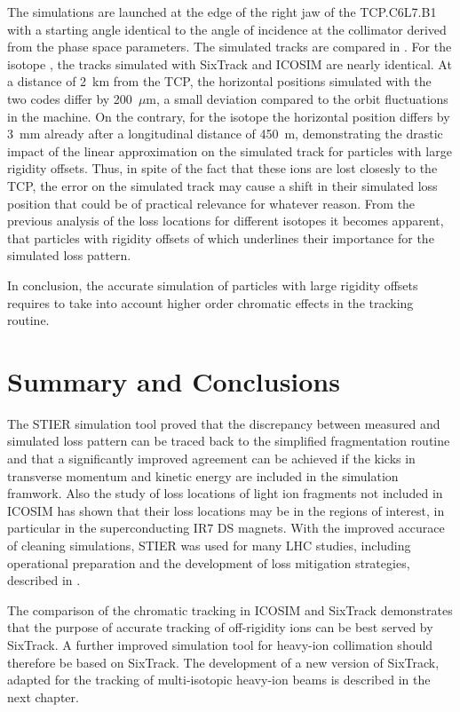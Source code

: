 The simulations are launched at the edge of the right jaw of the TCP.C6L7.B1 with a starting angle identical to the angle of incidence at the collimator derived from the phase space parameters. The simulated tracks are compared in . For the isotope , the tracks simulated with SixTrack and ICOSIM are nearly identical. At a distance of 2~km from the TCP, the horizontal positions simulated with the two codes differ by 200~$\mu$m, a small deviation compared to the orbit fluctuations in the machine. On the contrary, for the isotope  the horizontal position differs by 3~mm already after a longitudinal distance of 450~m, demonstrating the drastic impact of the linear approximation on the simulated track for particles with large rigidity offsets. Thus, in spite of the fact that these ions are lost closesly to the TCP, the error on the simulated track may cause a shift in their simulated loss position that could be of practical relevance for whatever reason. From the previous analysis of the loss locations for different isotopes it becomes apparent, that particles with rigidity offsets of which underlines their importance for the simulated loss pattern.

In conclusion, the accurate simulation of particles with large rigidity offsets requires to take into account higher order chromatic effects in the tracking routine. 



\section{Summary and Conclusions}

The STIER simulation tool proved that the discrepancy between measured and simulated loss pattern can be traced back to the simplified fragmentation routine and that a significantly improved agreement can be achieved if the kicks in transverse momentum and kinetic energy are included in the simulation framwork. Also the study of loss locations of light ion fragments not included in ICOSIM has shown that their loss locations may be in the regions of interest, in particular in the superconducting IR7 DS magnets. With the improved accurace of cleaning simulations, STIER was used for many LHC studies, including operational preparation and the development of loss mitigation strategies, described in .

The comparison of the chromatic tracking in ICOSIM and SixTrack demonstrates that the purpose of accurate tracking of off-rigidity ions can be best served by SixTrack. A further improved simulation tool for heavy-ion collimation should therefore be based on SixTrack. The development of a new version of SixTrack, adapted for the tracking of multi-isotopic heavy-ion beams is described in the next chapter.